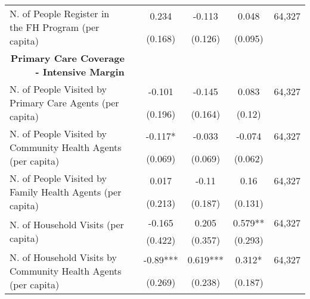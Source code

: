 \begin{table}[H]
\begin{footnotesize}
\begin{center}
{\begin{threeparttable}[b]
\begin{tabular}{rrrrrr}
    \multicolumn{1}{l}{\multirow{2}[0]{*}{N. of People Register in the FH Program (per capita)}} &       & \multicolumn{1}{c}{0.234} & \multicolumn{1}{c}{-0.113} & \multicolumn{1}{c}{0.048} & \multicolumn{1}{c}{   64,327 } \\
          &       & \multicolumn{1}{c}{(0.168)} & \multicolumn{1}{c}{(0.126)} & \multicolumn{1}{c}{(0.095)} &  \\
    \multicolumn{1}{p{19.07em}}{\textbf{Primary Care Coverage -  Intensive Margin}} &       &       &       &       &  \\
    \multicolumn{1}{l}{\multirow{2}[0]{*}{N. of People Visited by Primary Care Agents (per capita)}} &       & \multicolumn{1}{c}{-0.101} & \multicolumn{1}{c}{-0.145} & \multicolumn{1}{c}{0.083} & \multicolumn{1}{c}{   64,327 } \\
          &       & \multicolumn{1}{c}{(0.196)} & \multicolumn{1}{c}{(0.164)} & \multicolumn{1}{c}{(0.12)} &  \\
    \multicolumn{1}{l}{\multirow{2}[0]{*}{N. of People Visited by Community Health Agents (per capita)}} &       & \multicolumn{1}{c}{-0.117*} & \multicolumn{1}{c}{-0.033} & \multicolumn{1}{c}{-0.074} & \multicolumn{1}{c}{   64,327 } \\
          &       & \multicolumn{1}{c}{(0.069)} & \multicolumn{1}{c}{(0.069)} & \multicolumn{1}{c}{(0.062)} &  \\
    \multicolumn{1}{l}{\multirow{2}[0]{*}{N. of People Visited by Family Health Agents (per capita)}} &       & \multicolumn{1}{c}{0.017} & \multicolumn{1}{c}{-0.11} & \multicolumn{1}{c}{0.16} & \multicolumn{1}{c}{   64,327 } \\
          &       & \multicolumn{1}{c}{(0.213)} & \multicolumn{1}{c}{(0.187)} & \multicolumn{1}{c}{(0.131)} &  \\
    \multicolumn{1}{l}{\multirow{2}[0]{*}{N. of Household Visits (per capita)}} &       & \multicolumn{1}{c}{-0.165} & \multicolumn{1}{c}{0.205} & \multicolumn{1}{c}{0.579**} & \multicolumn{1}{c}{   64,327 } \\
          &       & \multicolumn{1}{c}{(0.422)} & \multicolumn{1}{c}{(0.357)} & \multicolumn{1}{c}{(0.293)} &  \\
    \multicolumn{1}{l}{\multirow{2}[0]{*}{N. of Household Visits by Community Health Agents (per capita)}} &       & \multicolumn{1}{c}{-0.89***} & \multicolumn{1}{c}{0.619***} & \multicolumn{1}{c}{0.312*} & \multicolumn{1}{c}{   64,327 } \\
          &       & \multicolumn{1}{c}{(0.269)} & \multicolumn{1}{c}{(0.238)} & \multicolumn{1}{c}{(0.187)} &  \\

\end{tabular}
\end{threeparttable}}
\end{center}
\end{footnotesize}
\end{table}
